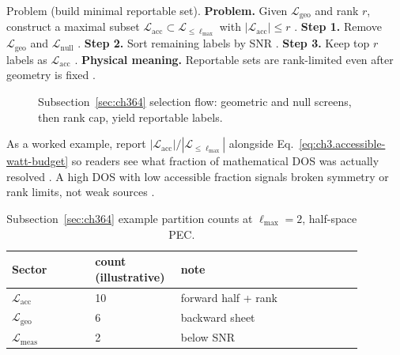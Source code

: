 Problem (build minimal reportable set). \textbf{Problem.} Given \(\mathcal{L}_{\mathrm{geo}}\) and rank \(r\), construct a maximal subset
\(\mathcal{L}_{\mathrm{acc}}\subset\mathcal{L}_{\le\ell_{\max}}\) with \(|\mathcal{L}_{\mathrm{acc}}|\le r\)
\cite{harrington2001}.
\textbf{Step 1.} Remove \(\mathcal{L}_{\mathrm{geo}}\) and \(\mathcal{L}_{\mathrm{null}}\) \cite{stratton1941}.
\textbf{Step 2.} Sort remaining labels by SNR \cite{devaney2004}.
\textbf{Step 3.} Keep top \(r\) labels as \(\mathcal{L}_{\mathrm{acc}}\) \cite{harrington2001}.
\textbf{Physical meaning.} Reportable sets are rank-limited even after geometry is fixed \cite{harrington2001}.
\begin{figure}[t]
\centering
{}
\caption{Subsection~\ref{sec:ch364} selection flow: geometric and null screens, then rank cap, yield reportable labels.}
\label{fig:ch3.364-selection-flow}
\end{figure}
As a worked example, report \(|\mathcal{L}_{\mathrm{acc}}|/|\mathcal{L}_{\le\ell_{\max}}|\) alongside
Eq.~\eqref{eq:ch3.accessible-watt-budget} so readers see what fraction of mathematical DOS was actually resolved
\cite{harrington2001}. A high DOS with low accessible fraction signals broken symmetry or rank limits, not
weak sources \cite{stratton1941}.
\begin{table}[t]
\centering
\caption{Subsection~\ref{sec:ch364} example partition counts at \(\ell_{\max}=2\), half-space PEC.}
\label{tab:ch3.364-example-counts}
\small
\begin{tabular}{@{}p{0.22\linewidth}p{0.18\linewidth}p{0.48\linewidth}@{}}
\toprule
Sector & count (illustrative) & note \\
\midrule
\(\mathcal{L}_{\mathrm{acc}}\) & 10 & forward half + rank \\
\(\mathcal{L}_{\mathrm{geo}}\) & 6 & backward sheet \\
\(\mathcal{L}_{\mathrm{meas}}\) & 2 & below SNR \\
\bottomrule
\end{tabular}
\end{table}

